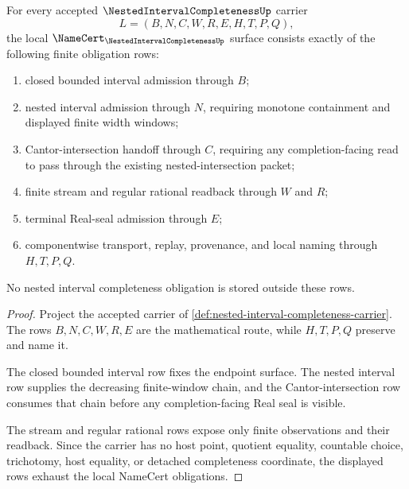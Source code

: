 \begin{theorem}
\label{thm:nested-interval-completeness-namecert-obligations}
For every accepted $\NestedIntervalCompletenessUp$ carrier
$$
L=(B,N,C,W,R,E,H,T,P,Q),
$$
the local $\NameCert_{\NestedIntervalCompletenessUp}$ surface consists exactly of the following finite obligation rows:
\begin{enumerate}
\item closed bounded interval admission through $B$;
\item nested interval admission through $N$, requiring monotone containment and displayed finite width windows;
\item Cantor-intersection handoff through $C$, requiring any completion-facing read to pass through the existing nested-intersection packet;
\item finite stream and regular rational readback through $W$ and $R$;
\item terminal Real-seal admission through $E$;
\item componentwise transport, replay, provenance, and local naming through $H,T,P,Q$.
\end{enumerate}
No nested interval completeness obligation is stored outside these rows.
\end{theorem}
\begin{proof}
Project the accepted carrier of \autoref{def:nested-interval-completeness-carrier}. The rows $B,N,C,W,R,E$ are the mathematical route, while $H,T,P,Q$ preserve and name it.

The closed bounded interval row fixes the endpoint surface. The nested interval row supplies the decreasing finite-window chain, and the Cantor-intersection row consumes that chain before any completion-facing Real seal is visible.

The stream and regular rational rows expose only finite observations and their readback. Since the carrier has no host point, quotient equality, countable choice, trichotomy, host equality, or detached completeness coordinate, the displayed rows exhaust the local NameCert obligations.
\end{proof}

